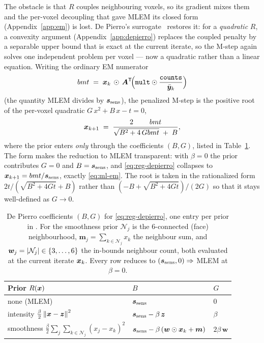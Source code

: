 The obstacle is that $R$ couples neighbouring voxels, so its gradient mixes them
and the per-voxel decoupling that gave MLEM its closed form (Appendix~\ref{app:em})
is lost. De Pierro's surrogate~\cite{depierro1995} restores it: for a
\emph{quadratic} $R$, a convexity argument (Appendix~\ref{app:depierro}) replaces
the coupled penalty by a separable upper bound that is exact at the current
iterate, so the M-step again solves one independent problem per voxel --- now a
quadratic rather than a linear equation. Writing the ordinary EM numerator
\begin{equation}
  \\bm{t} \;=\; \bm{x}_k \,\odot\, \bm{A}^{\mathsf{T}}\!\Bigl(\texttt{mult}\odot\frac{\texttt{counts}}{\bar{\bm{y}}_k}\Bigr)
  \label{eq:reg-numerator}
\end{equation}
(the quantity MLEM divides by $\bm{s}_{\mathrm{sens}}$), the penalized M-step is the positive root
of the per-voxel quadratic $G\,x^2 + B\,x - t = 0$,
\begin{equation}
  \bm{x}_{k+1} \;=\; \frac{2\,\\bm{t}}{\sqrt{B^2 + 4\,G\,\\bm{t}}\;+\;B},
  \label{eq:reg-depierro}
\end{equation}
where the prior enters \emph{only} through the coefficients $(B,G)$, listed in
Table~\ref{tab:reg-priors}. The form makes the reduction to MLEM transparent: with
$\beta=0$ the prior contributes $G=0$ and $B=\bm{s}_{\mathrm{sens}}$, and \eqref{eq:reg-depierro}
collapses to $\bm{x}_{k+1}=\\bm{t}/\bm{s}_{\mathrm{sens}}$, exactly \eqref{eq:ml-em}. The root is taken
in the rationalized form $2t/(\sqrt{B^2+4Gt}+B)$ rather than
$(-B+\sqrt{B^2+4Gt})/(2G)$ so that it stays well-defined as $G\to0$.

\begin{table}[t]
  \centering
  \begin{tabular}{@{}lll@{}}
    \toprule
    Prior $R(\bm{x})$ & $B$ & $G$ \\
    \midrule
    none (MLEM)
      & $\bm{s}_{\mathrm{sens}}$ & $0$ \\[2pt]
    intensity $\tfrac{\beta}{2}\left\lVert\bm{x}-\bm z\right\rVert^2$
      & $\bm{s}_{\mathrm{sens}}-\beta\,\bm z$ & $\beta$ \\[2pt]
    smoothness $\tfrac{\beta}{2}\sum_j\sum_{k\in\mathcal N_j}(x_j-x_k)^2$
      & $\bm{s}_{\mathrm{sens}}-\beta\,(\bm w\odot\bm{x}_k+\bm m)$ & $2\beta\,\bm w$ \\
    \bottomrule
  \end{tabular}
  \caption{De Pierro coefficients $(B,G)$ for \eqref{eq:reg-depierro}, one entry
    per prior in . For the smoothness prior $\mathcal N_j$ is
    the 6-connected (face) neighbourhood, $\bm m_j=\sum_{k\in\mathcal N_j}x_k$ the
    neighbour sum, and $\bm w_j=\left|\mathcal N_j\right|\in\{3,\dots,6\}$ the in-bounds
    neighbour count, both evaluated at the current iterate $\bm{x}_k$. Every row
    reduces to $(\bm{s}_{\mathrm{sens}},0)\Rightarrow$ MLEM at $\beta=0$.}
  \label{tab:reg-priors}
\end{table}

